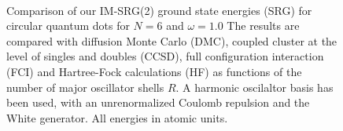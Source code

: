 \begin{figure}
  \centering
   \\
  \caption{Comparison of our IM-SRG(2) ground state energies (SRG) for circular quantum dots for $N=6$ and $\omega=1.0$ The results are compared with diffusion Monte Carlo (DMC), coupled cluster at the level of singles and doubles (CCSD), full configuration interaction (FCI) and Hartree-Fock calculations (HF) as functions of the number of major oscillator shells $R$. A harmonic oscilaltor basis has been used, with an unrenormalized Coulomb repulsion and the White generator. All energies in atomic units.}
  \label{fig:N6}
\end{figure}

